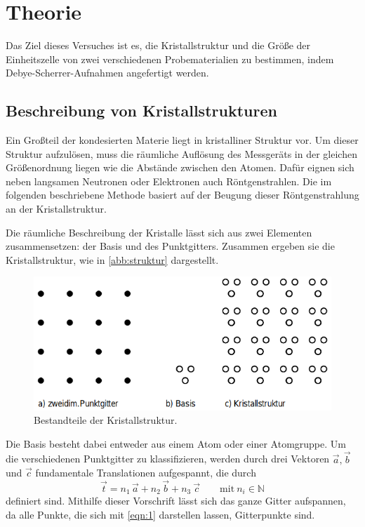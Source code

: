 \section{Theorie}
Das Ziel dieses Versuches ist es, die Kristallstruktur und die Größe der Einheitszelle
von zwei verschiedenen Probematerialien zu bestimmen, indem Debye-Scherrer-Aufnahmen
angefertigt werden.

\subsection{Beschreibung von Kristallstrukturen}
Ein Großteil der kondesierten Materie liegt in kristalliner Struktur vor.
Um dieser Struktur aufzulösen, muss die räumliche Auflösung des Messgeräts in der
gleichen Größenordnung liegen wie die Abstände zwischen den Atomen. Dafür eignen sich
neben langsamen Neutronen oder Elektronen auch Röntgenstrahlen. Die im folgenden
beschriebene Methode basiert auf der Beugung dieser Röntgenstrahlung an der Kristallstruktur.

Die räumliche Beschreibung der Kristalle lässt sich aus zwei Elementen zusammensetzen:
der Basis und des Punktgitters. Zusammen ergeben sie die Kristallstruktur, wie in
\autoref{abb:struktur} dargestellt.
\begin{figure}
  \centering
  \includegraphics[scale=0.5]{content/pics/basis_gitter.png}
  \caption{Bestandteile der Kristallstruktur. \cite{anleitung}}
  \label{abb:struktur}
\end{figure}
Die Basis besteht dabei entweder aus einem Atom oder einer Atomgruppe. Um die verschiedenen
Punktgitter zu klassifizieren, werden durch drei Vektoren $\vec{a}, \vec{b}$ und $\vec{c}$
fundamentale Translationen aufgespannt, die durch
\begin{equation}
  \vec{t} = n_1 \, \vec{a} + n_2 \, \vec{b} + n_3 \ \vec{c} \qquad \text{mit} \ n_i \in \mathbb{N}
  \label{eqn:1}
\end{equation}
definiert sind. Mithilfe dieser Vorschrift lässt sich das ganze Gitter aufspannen, da
alle Punkte, die sich mit \eqref{eqn:1} darstellen lassen, Gitterpunkte sind.

